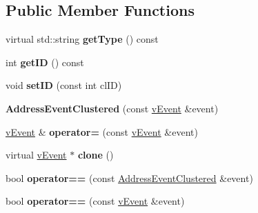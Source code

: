 \subsection*{Public Member Functions}
\begin{DoxyCompactItemize}
\item 
\hypertarget{classemorph_1_1AddressEventClustered_ab15c5a4a15575e5e501561f30024e6a9}{virtual std\-::string {\bfseries get\-Type} () const }\label{classemorph_1_1AddressEventClustered_ab15c5a4a15575e5e501561f30024e6a9}

\item 
\hypertarget{classemorph_1_1AddressEventClustered_a5c41b9fb439e9426df7c0905524613bb}{int {\bfseries get\-I\-D} () const }\label{classemorph_1_1AddressEventClustered_a5c41b9fb439e9426df7c0905524613bb}

\item 
\hypertarget{classemorph_1_1AddressEventClustered_aa0e78c11077e59e72c668240af137736}{void {\bfseries set\-I\-D} (const int cl\-I\-D)}\label{classemorph_1_1AddressEventClustered_aa0e78c11077e59e72c668240af137736}

\item 
\hypertarget{classemorph_1_1AddressEventClustered_a5b7af943ce1438eb599534ef34fa7cd5}{{\bfseries Address\-Event\-Clustered} (const \hyperlink{classemorph_1_1vEvent}{v\-Event} \&event)}\label{classemorph_1_1AddressEventClustered_a5b7af943ce1438eb599534ef34fa7cd5}

\item 
\hypertarget{classemorph_1_1AddressEventClustered_af62943d8c4759b5525a11d03fd1048ab}{\hyperlink{classemorph_1_1vEvent}{v\-Event} \& {\bfseries operator=} (const \hyperlink{classemorph_1_1vEvent}{v\-Event} \&event)}\label{classemorph_1_1AddressEventClustered_af62943d8c4759b5525a11d03fd1048ab}

\item 
\hypertarget{classemorph_1_1AddressEventClustered_a07cbe4c77027546a0b62d827c9993827}{virtual \hyperlink{classemorph_1_1vEvent}{v\-Event} $\ast$ {\bfseries clone} ()}\label{classemorph_1_1AddressEventClustered_a07cbe4c77027546a0b62d827c9993827}

\item 
\hypertarget{classemorph_1_1AddressEventClustered_ab79d067ee13c48910150364998572632}{bool {\bfseries operator==} (const \hyperlink{classemorph_1_1AddressEventClustered}{Address\-Event\-Clustered} \&event)}\label{classemorph_1_1AddressEventClustered_ab79d067ee13c48910150364998572632}

\item 
\hypertarget{classemorph_1_1AddressEventClustered_a14885a84ec35ac6ac3b7b012fa89b9f8}{bool {\bfseries operator==} (const \hyperlink{classemorph_1_1vEvent}{v\-Event} \&event)}\label{classemorph_1_1AddressEventClustered_a14885a84ec35ac6ac3b7b012fa89b9f8}


\end{DoxyCompactItemize}
